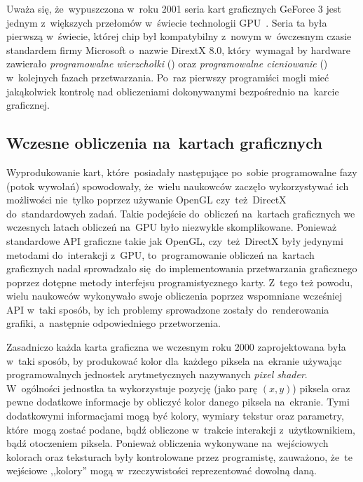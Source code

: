 Uważa się, że~wypuszczona w~roku 2001 seria kart graficznych GeForce 3 jest jednym z~większych przełomów w~świecie technologii GPU~\cite{nvidia:geforce3,Cuda:Example}. Seria ta była pierwszą w~świecie, której chip był kompatybilny z~nowym w~ówczesnym czasie standardem firmy Microsoft o~nazwie DirextX 8.0, który~wymagał by hardware zawierało \emph{programowalne wierzchołki} () oraz \emph{programowalne cieniowanie} () w~kolejnych fazach przetwarzania. Po~raz pierwszy programiści mogli mieć jakąkolwiek kontrolę nad obliczeniami dokonywanymi bezpośrednio na~karcie graficznej.

\subsection{Wczesne obliczenia na~kartach graficznych}
\label{sec:wczesne}

Wyprodukowanie kart, które~posiadały następujące po~sobie programowalne fazy (potok wywołań) spowodowały, że~wielu naukowców zaczęło wykorzystywać ich możliwości nie~tylko poprzez używanie OpenGL czy~też~DirectX do~standardowych zadań. Takie podejście do~obliczeń na~kartach graficznych we wczesnych latach obliczeń na~GPU było niezwykle skomplikowane. Ponieważ standardowe API graficzne takie jak OpenGL, czy~też~DirectX były jedynymi metodami do~interakcji z~GPU, to~programowanie obliczeń na~kartach graficznych nadal sprowadzało się~do implementowania przetwarzania graficznego poprzez dotępne metody interfejsu programistycznego karty. Z~tego też powodu, wielu naukowców wykonywało swoje obliczenia poprzez wspomniane wcześniej API w~taki sposób, by ich problemy sprowadzone zostały do~renderowania grafiki, a~następnie odpowiedniego przetworzenia.

Zasadniczo każda karta graficzna we wczesnym roku 2000 zaprojektowana była w~taki sposób, by produkować kolor dla~każdego piksela na~ekranie używając programowalnych jednostek arytmetycznych nazywanych \emph{pixel shader}. W~ogólności jednostka ta wykorzystuje pozycję (jako parę $(x, y)$) piksela oraz pewne dodatkowe informacje by obliczyć kolor danego piksela na~ekranie. Tymi dodatkowymi informacjami mogą być kolory, wymiary tekstur oraz parametry, które~mogą zostać podane, bądź obliczone w~trakcie interakcji z~użytkownikiem, bądź otoczeniem piksela. Ponieważ obliczenia wykonywane na~wejściowych kolorach oraz teksturach były kontrolowane przez programistę, zauważono, że~te wejściowe ,,kolory'' mogą w~rzeczywistości reprezentować dowolną daną.

